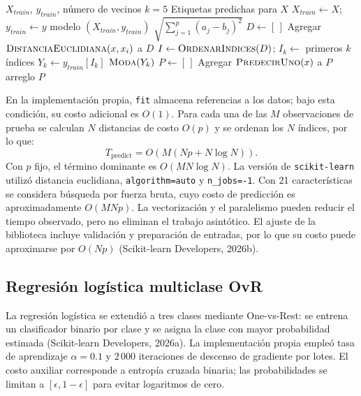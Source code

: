 \documentclass[10pt,letterpaper,twocolumn]{article}
\begin{document}
\begin{algorithm}[H]
\caption{Clasificador KNN propio}
\label{alg:knn}
\begin{algorithmic}[1]
\Require $X_{train}$, $y_{train}$, número de vecinos $k=5$
\Ensure Etiquetas predichas para $X$
  \State $X_{train}\gets X$; $y_{train}\gets y$
  \State \Return modelo $(X_{train},y_{train})$
\EndFunction
{}
  \State \Return $\sqrt{\sum_{j=1}^{p}(a_j-b_j)^2}$
\EndFunction
{}
  \State $D\gets[\,]$
    \State Agregar $\Call{DistanciaEuclidiana}{x,x_i}$ a $D$
  \EndFor
  \State $I\gets\Call{OrdenarIndices}{D}$; $I_k\gets$ primeros $k$ índices
  \State $Y_k\gets y_{train}[I_k]$
  \State \Return $\Call{Moda}{Y_k}$
\EndFunction
{}
  \State $P\gets[\,]$
    \State Agregar $\Call{PredecirUno}{x}$ a $P$
  \EndFor
  \State \Return arreglo $P$
\EndFunction
\end{algorithmic}
\end{algorithm}

En la implementación propia, \texttt{fit} almacena referencias a los datos; bajo esta condición, su costo adicional es $O(1)$. Para cada una de las $M$ observaciones de prueba se calculan $N$ distancias de costo $O(p)$ y se ordenan los $N$ índices, por lo que:
\[
T_{\mathrm{predict}}=O\!\left(M(Np+N\log N)\right).
\]
Con $p$ fijo, el término dominante es $O(MN\log N)$. La versión de \texttt{scikit-learn} utilizó distancia euclidiana, \texttt{algorithm=auto} y \texttt{n\_jobs=-1}. Con 21 características se considera búsqueda por fuerza bruta, cuyo costo de predicción es aproximadamente $O(MNp)$. La vectorización y el paralelismo pueden reducir el tiempo observado, pero no eliminan el trabajo asintótico. El ajuste de la biblioteca incluye validación y preparación de entradas, por lo que su costo puede aproximarse por $O(Np)$ (Scikit-learn Developers, 2026b).

\subsection{Regresión logística multiclase OvR}
La regresión logística se extendió a tres clases mediante One-vs-Rest: se entrena un clasificador binario por clase y se asigna la clase con mayor probabilidad estimada (Scikit-learn Developers, 2026a). La implementación propia empleó tasa de aprendizaje $\alpha=0.1$ y 2\,000 iteraciones de descenso de gradiente por lotes. El costo auxiliar corresponde a entropía cruzada binaria; las probabilidades se limitan a $[\epsilon,1-\epsilon]$ para evitar logaritmos de cero.
\end{document}
